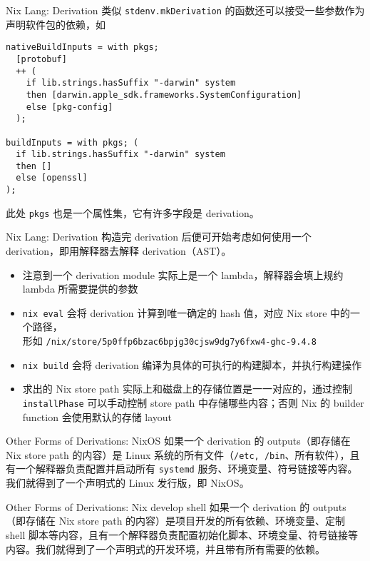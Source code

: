 \documentclass{beamer}
\begin{document}
\begin{frame}[fragile]{Nix Lang: Derivation}
类似 {\tt stdenv.mkDerivation} 的函数还可以接受一些参数作为声明软件包的依赖，如
\begin{verbatim}
nativeBuildInputs = with pkgs;
  [protobuf]
  ++ (
    if lib.strings.hasSuffix "-darwin" system
    then [darwin.apple_sdk.frameworks.SystemConfiguration]
    else [pkg-config]
  );

buildInputs = with pkgs; (
  if lib.strings.hasSuffix "-darwin" system
  then []
  else [openssl]
);
\end{verbatim}
此处 {\tt pkgs} 也是一个属性集，它有许多字段是 derivation。
\end{frame}

\begin{frame}[fragile]{Nix Lang: Derivation}
构造完 derivation 后便可开始考虑如何使用一个 derivation，即用解释器去解释 derivation（AST）。

\begin{itemize}
    \item 注意到一个 derivation module 实际上是一个 lambda，解释器会填上规约 lambda 所需要提供的参数
    \item {\tt nix eval} 会将 derivation 计算到唯一确定的 hash 值，对应 Nix store 中的一个路径，\\ 形如 {\tt /nix/store/5p0ffp6bzac6bpjg30cjsw9dg7y6fxw4-ghc-9.4.8}
    \item {\tt nix build} 会将 derivation 编译为具体的可执行的构建脚本，并执行构建操作
    \item 求出的 Nix store path 实际上和磁盘上的存储位置是一一对应的，通过控制 {\tt installPhase} 可以手动控制 store path 中存储哪些内容；否则 Nix 的 builder function 会使用默认的存储 layout
\end{itemize}

\end{frame}

\begin{frame}[fragile]{Other Forms of Derivations: NixOS}
如果一个 derivation 的 outputs（即存储在 Nix store path 的内容）是 Linux 系统的所有文件（{\tt /etc, /bin}、所有软件），且有一个解释器负责配置并启动所有 {\tt systemd} 服务、环境变量、符号链接等内容。我们就得到了一个声明式的 Linux 发行版，即 NixOS。
\end{frame}

\begin{frame}[fragile]{Other Forms of Derivations: Nix develop shell}
如果一个 derivation 的 outputs（即存储在 Nix store path 的内容）是项目开发的所有依赖、环境变量、定制 shell 脚本等内容，且有一个解释器负责配置初始化脚本、环境变量、符号链接等内容。我们就得到了一个声明式的开发环境，并且带有所有需要的依赖。
\end{frame}
\end{document}
